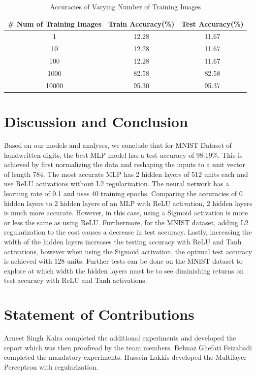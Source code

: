 \documentclass[11pt]{homework}
\begin{document}
\begin{table}[h!] 
    \centering
    \begin{tabular}{||c c c||} 
    \hline
         # Num of Training Images & Train Accuracy(\%) & Test Accuracy(\%) \\ [0.5ex]
         \hline\hline
         1     & 12.28 & 11.67\\
         10    & 12.28 & 11.67\\
         100   & 12.28 & 11.67\\
         1000  & 82.58 & 82.58\\
         10000 & 95.30 & 95.37\\
         \hline
    \end{tabular}
    \caption{Accuracies of Varying Number of Training Images}
    \label{table-varying-set-size}
\end{table}


\section{Discussion and Conclusion}
Based on our models and analyses, we conclude that for MNIST Dataset of handwritten digits, the best MLP model has a test accuracy of 98.19\%. This is achieved by first normalizing the data and reshaping the inputs to a unit vector of length 784. The most accurate MLP has 2 hidden layers of 512 units each and use ReLU activations without L2 regularization. The neural network has a learning rate of 0.1 and uses 40 training epochs. Comparing the accuracies of 0 hidden layers to 2 hidden layers of an MLP with ReLU activation, 2 hidden layers is much more accurate. However, in this case, using a Sigmoid activation is more or less the same as using ReLU. Furthermore, for the MNIST dataset, adding L2 regularization to the cost causes a decrease in test accuracy. Lastly, increasing the width of the hidden layers increases the testing accuracy with ReLU and Tanh activations, however when using the Sigmoid activation, the optimal test accuracy is achieved with 128 units. Further tests can be done on the MNIST dataset to explore at which width the hidden layers must be to see diminishing returns on test accuracy with ReLU and Tanh activations. 

\section{Statement of Contributions}
Arneet Singh Kalra completed the additional experiments and developed the report which was then proofread by the team members. Behnaz Ghefati Feizabadi completed the mandatory experiments. Hussein Lakkis developed the Multilayer Perceptron with regularization. 

\printbibliography
\end{document}
